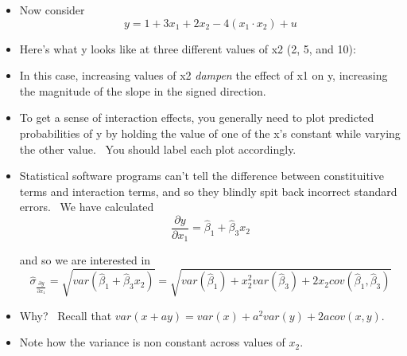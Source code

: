 \documentclass[11pt]{article}
\begin{document}
\begin{itemize}
\item Now consider%
\begin{equation*}
y=1+3x_{1}+2x_{2}-4\left( x_{1}\cdot x_{2}\right) +u
\end{equation*}

\item Here's what y looks like at three different values of x2 (2, 5, and
10):


\item In this case, increasing values of x2 \textit{dampen} the effect of x1
on y, increasing the magnitude of the slope in the signed direction.

\item To get a sense of interaction effects, you generally need to plot
predicted probabilities of y by holding the value of one of the x's constant
while varying the other value. \ You should label each plot accordingly.

\item Statistical software programs can't tell the difference between
constituitive terms and interaction terms, and so they blindly spit back
incorrect standard errors. \ We have calculated%
\begin{equation*}
\frac{\partial y}{\partial x_{1}}=\widehat{\beta }_{1}+\widehat{\beta }%
_{3}x_{2}
\end{equation*}

and so we are interested in 
\begin{equation*}
\widehat{\sigma }_{\frac{\partial y}{\partial x_{1}}}=\sqrt{var\left( 
\widehat{\beta }_{1}+\widehat{\beta }_{3}x_{2}\right) }=\sqrt{var\left( 
\widehat{\beta }_{1}\right) +x_{2}^{2}var\left( \widehat{\beta }_{3}\right)
+2x_{2}cov\left( \widehat{\beta }_{1},\widehat{\beta }_{3}\right) }
\end{equation*}

\item Why? \ Recall that $var\left( x+ay\right)
=var(x)+a^{2}var(y)+2acov(x,y).$ \ 

\item Note how the variance is non constant across values of $x_{2}$. \ 


\end{itemize}
\end{document}
